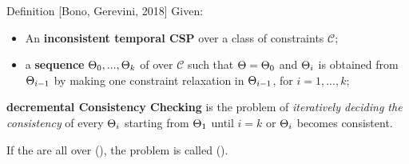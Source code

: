 \begin{frame}{Definition [Bono, Gerevini, 2018]}
    \vspace{-8pt}
    Given:
	\begin{itemize}
		\item \small{An \textbf{inconsistent temporal CSP} \CSP{} over a class of constraints $\mathcal{C}$};
		\item \small{a \textbf{sequence} $\CSP{}_{0}, ..., \CSP{}_k$ of \TCSPNames{} over $\mathcal{C}$ such that $\CSP{}= \CSP{}_{0}$ and $\CSP{}_i$ is obtained from $\CSP{}_{i-1}$ by making one constraint relaxation in $\CSP{}_{i-1}$, for $i = 1, ..., k$};
	\end{itemize}
	\textbf{\color{blue} decremental Consistency Checking} is the problem of \textit{iteratively deciding the consistency} of every $\CSP{}_i$ starting from $\CSP{}_1$ until $i = k$ or $\CSP{}_i$ becomes consistent.


    If the \TCSPNames{} are all over \PAName{} (\OrdHornName{}), the problem is called \DPSATProblemName{} (\DOHSATProblemName{}).
\end{frame}

